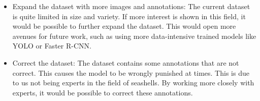 \begin{itemize}
    \item Expand the dataset with more images and annotations: The current dataset is quite limited in size and variety. If more interest is shown in this field, it would be possible to further expand the dataset. This would open more avenues for future work, such as using more data-intensive trained models like YOLO or Faster R-CNN.
    \item Correct the dataset: The dataset contains some annotations that are not correct. This causes the model to be wrongly punished at times. This is due to us not being experts in the field of seashells. By working more closely with experts, it would be possible to correct these annotations.
\end{itemize}